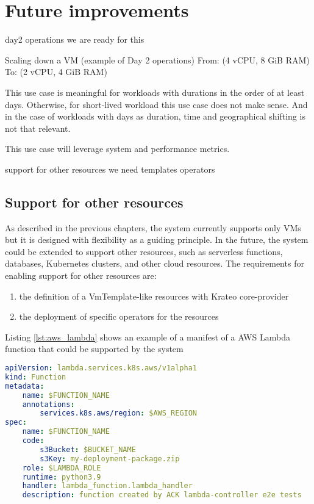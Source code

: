 \section{Future improvements}

day2 operations
we are ready for this

Scaling down a VM (example of Day 2 operations)
From: (4 vCPU, 8 GiB RAM)
To: (2 vCPU, 4 GiB RAM)

This use case is meaningful for workloads with durations in the order of at least days. Otherwise, for short-lived workload this use case does not make sense.
And in the case of workloads with days as duration, time and geographical shifting is not that relevant.

This use case will leverage system and performance metrics.



support for other resources
we need
templates
operators

\subsection{Support for other resources}

As described in the previous chapters, the system currently supports only VMs but it is designed with flexibility as a guiding principle.
In the future, the system could be extended to support other resources, such as serverless functions, databases, Kubernetes clusters, and other cloud resources.
The requirements for enabling support for other resources are: 
\begin{enumerate}
    \item the definition of a VmTemplate-like resources with Krateo core-provider
    \item the deployment of specific operators for the resources
\end{enumerate}

Listing \ref{lst:aws_lambda} shows an example of a manifest of a AWS Lambda function that could be supported by the system \cite{aws_lambda_ack}

\begin{lstlisting}[language=yaml, caption=AWS Lambda manifest example \cite{aws_lambda_ack}, label=lst:aws_lambda]
apiVersion: lambda.services.k8s.aws/v1alpha1
kind: Function
metadata:
    name: $FUNCTION_NAME
    annotations:
        services.k8s.aws/region: $AWS_REGION
spec:
    name: $FUNCTION_NAME
    code:
        s3Bucket: $BUCKET_NAME
        s3Key: my-deployment-package.zip
    role: $LAMBDA_ROLE
    runtime: python3.9
    handler: lambda_function.lambda_handler
    description: function created by ACK lambda-controller e2e tests
\end{lstlisting}



